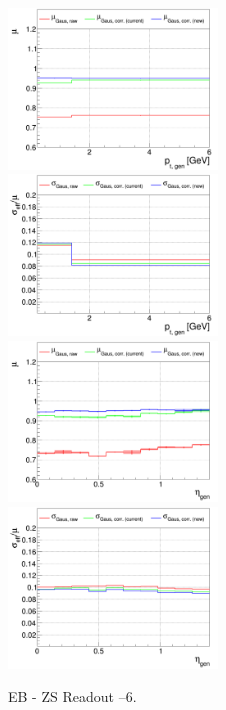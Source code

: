 \begin{figure}
\includegraphics[width=0.495\textwidth]{./plots_pdf/ECAL_plots/plotsPU/EB/ZS/pdf/GENPT/EBZS_GENPT_0000_0006_MuOverBins.pdf}
\includegraphics[width=0.495\textwidth]{./plots_pdf/ECAL_plots/plotsPU/EB/ZS/pdf/GENPT/EBZS_GENPT_0000_0006_EffSigmaOverBins.pdf}
\includegraphics[width=0.495\textwidth]{./plots_pdf/ECAL_plots/plotsPU/EB/ZS/pdf/GENETA/EBZS_GENETA_0000_0006_MuOverBins.pdf}
\includegraphics[width=0.495\textwidth]{./plots_pdf/ECAL_plots/plotsPU/EB/ZS/pdf/GENETA/EBZS_GENETA_0000_0006_EffSigmaOverBins.pdf}
\caption[Energy response of PF ECAL cluster for PU EB ZS readout senario]{EB - ZS Readout --6\GeV.}
\label{fig:PU_EBZS}
\end{figure}


